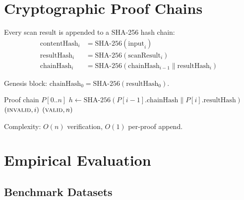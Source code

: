 \documentclass[11pt,twocolumn]{article}
\begin{document}
\section{Cryptographic Proof Chains}
\label{sec:proofs}

Every scan result is appended to a SHA-256 hash chain:
\begin{align}
\text{contentHash}_i &= \text{SHA-256}(\text{input}_i) \label{eq:content}\\
\text{resultHash}_i &= \text{SHA-256}(\text{scanResult}_i) \label{eq:result}\\
\text{chainHash}_i &= \text{SHA-256}(\text{chainHash}_{i-1} \| \text{resultHash}_i) \label{eq:chain}
\end{align}

Genesis block: $\text{chainHash}_0 = \text{SHA-256}(\text{resultHash}_0)$.

\begin{algorithm}[h]
\caption{Proof Chain Verification}
\label{alg:verify}
\begin{algorithmic}[1]
\Require Proof chain $P[0..n]$
  \State $h \gets \text{SHA-256}(P[i{-}1].\text{chainHash} \| P[i].\text{resultHash})$
    \State \Return $(\textsc{invalid}, i)$
  \EndIf
\EndFor
\State \Return $(\textsc{valid}, n)$
\end{algorithmic}
\end{algorithm}

Complexity: $O(n)$ verification, $O(1)$ per-proof append.

\section{Empirical Evaluation}
\label{sec:eval}

\subsection{Benchmark Datasets}
\end{document}
